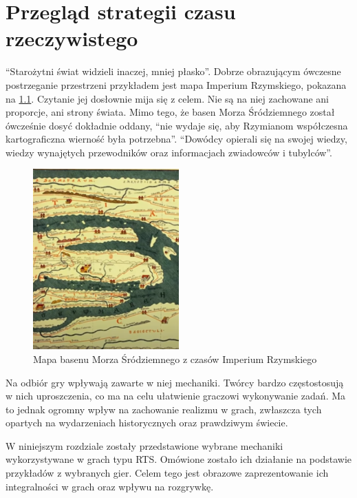 \chapter{Przegląd strategii czasu rzeczywistego}

“Starożytni świat widzieli inaczej, mniej płasko”\cite{gbobrektvgry}. Dobrze obrazującym ówczesne postrzeganie przestrzeni przykładem jest mapa Imperium Rzymskiego,
pokazana na \ref{fig:mapaIR}. Czytanie jej dosłownie mija się z celem. Nie są na niej zachowane ani proporcje, ani strony świata. Mimo tego, że
basen Morza Śródziemnego został ówcześnie dosyć dokładnie oddany, “nie wydaje się, aby Rzymianom współczesna kartograficzna wierność była potrzebna”\cite{gbobrektvgry}.
“Dowódcy opierali się na swojej wiedzy, wiedzy wynajętych przewodników oraz informacjach zwiadowców i tubylców”\cite{gbobrektvgry}.
\begin{figure}[htbp]
    \centering
    \includegraphics[width=0.5\textwidth]{images/mapaIR.png}
    \caption{Mapa basenu Morza Śródziemnego z czasów Imperium Rzymskiego}\label{fig:mapaIR}
\end{figure}

Na odbiór gry wpływają zawarte w niej mechaniki. Twórcy bardzo częstostosują w nich uproszczenia, co ma na celu
ułatwienie graczowi wykonywanie zadań. Ma to jednak ogromny wpływ na zachowanie realizmu w grach, zwłaszcza tych opartych
na wydarzeniach historycznych oraz prawdziwym świecie. 

W niniejszym rozdziale zostały przedstawione wybrane mechaniki wykorzystywane w grach typu RTS. Omówione zostało ich
działanie na podstawie przykładów z wybranych gier. Celem tego jest obrazowe zaprezentowanie ich integralności
w grach oraz wpływu na rozgrywkę.